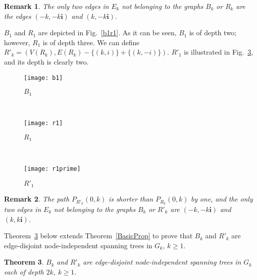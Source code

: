 \documentclass[12pt,journal,compsoc,onecolumn,]{IEEEtran}
\newtheorem{theorem}{Theorem}
\newtheorem{remark}[theorem]{Remark}
\begin{document}
{\bigskip
\begin{remark}
The only two edges in $E_{k}$ not belonging to the graphs $B_{k}$ or $R_{k}$ are
the edges $\left(  -k,-k\mathbf{i}\right)  $ and $\left(  k,-k\mathbf{i}\right) $.
\end{remark}

\bigskip
$B_1$ and $R_1$ are depicted in Fig.~\ref{b1r1}. As it can be seen, $B_1$ is of depth two;
however, $R_1$ is of depth three.
We can define $R'_k = (V(R_k), E(R_k) - \{(k, i)\} + \{(k, -i)\})$.
$R'_1$ is illustrated in Fig.~\ref{r1prime}, and its depth is clearly two.
\begin{figure*}[t!]
    \centering
    \begin{subfigure}[b]{0.5\textwidth}
        \centering
        \texttt{[image: b1]}
        \caption{$B_1$}
        \label{b1}
    \end{subfigure}~
    \begin{subfigure}[b]{0.5\textwidth}
        \centering
        \texttt{[image: r1]}
        \caption{$R_1$}
        \label{r1}
    \end{subfigure}
    ~
    \begin{subfigure}[b]{0.5\textwidth}
        \centering
        \texttt{[image: r1prime]}
        \caption{$R'_1$}
        \label{r1prime}
    \end{subfigure}
    \caption{$B_1$, $R_1$, and $R'_1$}
    \label{b1r1}
\end{figure*} 
\bigskip
\begin{remark}
\label{BkR'k}
The path $P_{R'_k}(0, k)$ is shorter than $P_{R_k}(0, k)$ by one, and
the only two edges in $E_{k}$ not belonging to the graphs $B_{k}$ or $R'_{k}$ are
$\left(-k,-k\mathbf{i}\right)  $ and $\left(  k,k\mathbf{i}\right)$.
\end{remark}

\bigskip
Theorem~\ref{EXTEND} below extends Theorem~\ref{BasicProp} to prove that $B_k$ and $R'_k$ are edge-disjoint
node-independent spanning trees in $G_k$, $k \ge 1$.


\bigskip
\begin{theorem}
\label{EXTEND}
$B_k$ and $R'_k$ are edge-disjoint
node-independent spanning trees in $G_k$ each of depth $2k$, $k \ge 1$.
\end{theorem}

}
\end{document}
